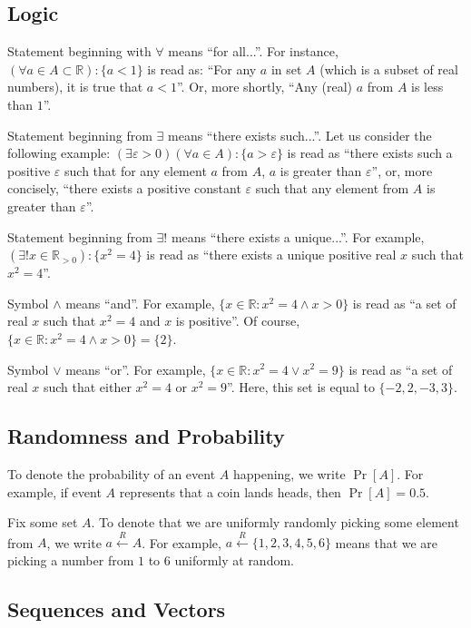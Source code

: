 \documentclass[../lecture-notes.tex]{subfiles}
\begin{document}
\subsection{Logic}

Statement beginning with $\forall$ means ``for all...''. For instance, $(\forall a \in A \subset \mathbb{R}): \{a < 1\}$ is read as: ``For any $a$ in set $A$ (which is a subset of real numbers), it is true that $a<1$''. Or, more shortly, ``Any (real) $a$ from $A$ is less than $1$''.

Statement beginning from $\exists$ means ``there exists such...''. Let us consider the following example: $(\exists \varepsilon > 0) (\forall a \in A): \{a > \varepsilon\}$ is read as ``there exists such a positive $\varepsilon$ such that for any element $a$ from $A$, $a$ is greater than $\varepsilon$'', or, more concisely, ``there exists a positive constant $\varepsilon$ such that any element from $A$ is greater than $\varepsilon$''.

Statement beginning from $\exists !$ means ``there exists a unique...''. For example, $(\exists! x \in \mathbb{R}_{>0}): \{x^2 = 4\}$ is read as ``there exists a unique positive real $x$ such that $x^2 = 4$''.

Symbol $\wedge$ means ``and''. For example, $\{x \in \mathbb{R}: x^2 = 4 \wedge x > 0\}$ is read as ``a set of real $x$ such that $x^2=4$ and $x$ is positive''. Of course, $\{x \in \mathbb{R}: x^2 = 4 \wedge x > 0\} = \{2\}$.

Symbol $\vee$ means ``or''. For example, $\{x \in \mathbb{R}: x^2 = 4 \vee x^2 = 9\}$ is read as ``a set of real $x$ such that either $x^2=4$ or $x^2=9$''. Here, this set is equal to $\{-2,2,-3,3\}$.

\subsection{Randomness and Probability}

To denote the probability of an event $A$ happening, we write $\Pr[A]$. For example, if event $A$ represents that a coin lands heads, then $\Pr[A] = 0.5$.

Fix some set $A$. To denote that we are uniformly randomly picking some element from $A$, we write $a \xleftarrow{R} A$. For example, $a \xleftarrow{R} \{1,2,3,4,5,6\}$ means that we are picking a number from $1$ to $6$ uniformly at random.

\subsection{Sequences and Vectors}
\end{document}
